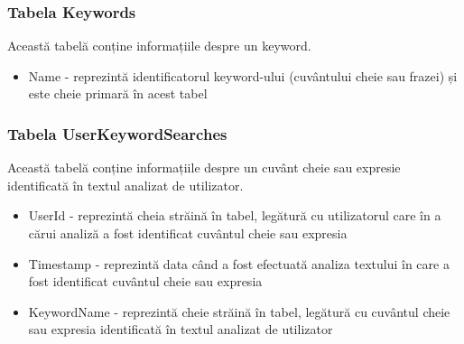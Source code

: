 \subsubsection{Tabela Keywords}
Această tabelă conține informațiile despre un keyword.
\begin{itemize}
	\setlength\itemsep{0.5em}
	\item Name - reprezintă identificatorul keyword-ului (cuvântului cheie sau frazei) și este cheie primară în acest tabel
\end{itemize}

\subsubsection{Tabela UserKeywordSearches}
Această tabelă conține informațiile despre un cuvânt cheie sau expresie identificată în textul analizat de utilizator.
\begin{itemize}
	\setlength\itemsep{0.5em}
	\item UserId - reprezintă cheia străină în tabel, legătură cu utilizatorul care în a cărui analiză a fost identificat cuvântul cheie sau expresia
	\item Timestamp - reprezintă data când a fost efectuată analiza textului în care a fost identificat cuvântul cheie sau expresia
	\item KeywordName - reprezintă cheie străină în tabel, legătură cu cuvântul cheie sau expresia identificată în textul analizat de utilizator
\end{itemize}

